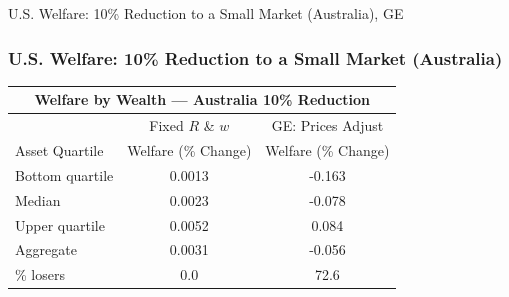 \documentclass[9pt,pdftex,aspectratio=1610]{beamer}
\theoremstyle{definition}
\begin{document}
\begin{frame}[t]{U.S. Welfare: 10\% Reduction to a Small Market (Australia), {\color{red} GE} }
\vspace{-.5cm}
\begin{figure}[!t]
\end{figure}
\end{frame}


\begin{frame}[t]
\frametitle{U.S. Welfare: 10\% Reduction to a Small Market (Australia)}
\begin{table}[t]
\footnotesize
\setlength {\tabcolsep}{6.05mm}
\renewcommand{\arraystretch}{1.80}
\begin{center}
\begin{tabular}{l c c}
\multicolumn{3}{c}{\small \textbf{Welfare by Wealth --- Australia {\color{red} 10\%} Reduction}}\\
\hline
\hline
& \footnotesize  Fixed $R$ \& $w$ & GE: Prices Adjust \\
\cmidrule(lr){2-2}  \cmidrule(lr){3-3}
\footnotesize  Asset Quartile & \footnotesize  Welfare (\% Change) & \footnotesize  Welfare (\% Change) \\
\footnotesize  Bottom quartile  & 0.0013 & -0.163 \\
\footnotesize  Median & 0.0023 & -0.078 \\
\footnotesize  Upper quartile  & 0.0052 & 0.084  \\
\footnotesize  Aggregate & 0.0031 & -0.056  \\
\cmidrule(lr){2-2}  \cmidrule(lr){3-3}
\footnotesize  \% losers & 0.0 & 72.6\\
\hline
\end{tabular}
\end{center}
\end{table}
\end{frame}
\end{document}
